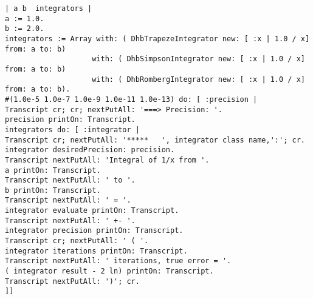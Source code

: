 \begin{verbatim}
| a b  integrators |
a := 1.0.
b := 2.0.
integrators := Array with: ( DhbTrapezeIntegrator new: [ :x | 1.0 / x] from: a to: b)
					with: ( DhbSimpsonIntegrator new: [ :x | 1.0 / x] from: a to: b)
					with: ( DhbRombergIntegrator new: [ :x | 1.0 / x] from: a to: b).
#(1.0e-5 1.0e-7 1.0e-9 1.0e-11 1.0e-13) do: [ :precision |
Transcript cr; cr; nextPutAll: '===> Precision: '.
precision printOn: Transcript.
integrators do: [ :integrator |
Transcript cr; nextPutAll: '*****   ', integrator class name,':'; cr.
integrator desiredPrecision: precision.
Transcript nextPutAll: 'Integral of 1/x from '.
a printOn: Transcript.
Transcript nextPutAll: ' to '.
b printOn: Transcript.
Transcript nextPutAll: ' = '.
integrator evaluate printOn: Transcript.
Transcript nextPutAll: ' +- '.
integrator precision printOn: Transcript.
Transcript cr; nextPutAll: ' ( '.
integrator iterations printOn: Transcript.
Transcript nextPutAll: ' iterations, true error = '.
( integrator result - 2 ln) printOn: Transcript.
Transcript nextPutAll: ')'; cr.
]]
\end{verbatim}